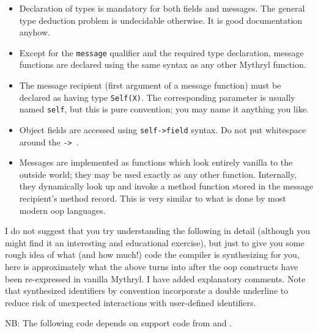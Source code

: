 \begin{itemize}

\item Declaration of types is mandatory for both fields and messages. 
      The general type deduction problem is undecidable otherwise. It 
      is good documentation anyhow.

\item Except for the {\tt message} qualifier and the required type 
      declaration, message functions are declared using the same syntax 
      as any other Mythryl function.

\item The message recipient (first argument of a message function) 
      must be declared as having type {\tt Self(X)}.  The corresponding 
      parameter is usually named {\tt self}, but this is pure convention; 
      you may name it anything you like.

\item Object fields are accessed using {\tt self->field} syntax.  Do not 
      put whitespace around the {\tt -> }.

\item Messages are implemented as functions which look entirely vanilla 
      to the outside world;  they may be used exactly as any other function. 
      Internally, they dynamically look up and invoke a method function 
      stored in the message recipient's method record.  This is very 
      similar to what is done by most modern oop languages.

\end{itemize}

I do not suggest that you try understanding the following in detail 
(although you might find it an interesting and educational exercise), 
but just to give you some rough idea of what (and how much!) code 
the compiler is synthesizing for you, here is approximately what 
the above turns into after the oop constructs have been re-expressed 
in vanilla Mythryl.  I have added explanatory comments.  Note that 
synthesized identifiers by convention incorporate a double underline 
to reduce risk of unexpected interactions with user-defined identifiers.

NB: The following code depends on support code from 
 and 
.

